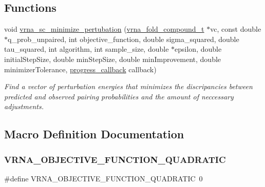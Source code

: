 \subsection*{Functions}
\begin{DoxyCompactItemize}
\item 
void \hyperlink{group__perturbation_gaa124bdc20d88001c38ade590c4bcc3c4}{vrna\+\_\+sc\+\_\+minimize\+\_\+pertubation} (\hyperlink{group__fold__compound_ga1b0cef17fd40466cef5968eaeeff6166}{vrna\+\_\+fold\+\_\+compound\+\_\+t} $\ast$vc, const double $\ast$q\+\_\+prob\+\_\+unpaired, int objective\+\_\+function, double sigma\+\_\+squared, double tau\+\_\+squared, int algorithm, int sample\+\_\+size, double $\ast$epsilon, double initial\+Step\+Size, double min\+Step\+Size, double min\+Improvement, double minimizer\+Tolerance, \hyperlink{group__perturbation_gaa715397c7afd2d2955c315512a3d571a}{progress\+\_\+callback} callback)
\begin{DoxyCompactList}\small\item\em Find a vector of perturbation energies that minimizes the discripancies between predicted and observed pairing probabilities and the amount of neccessary adjustments. \end{DoxyCompactList}\end{DoxyCompactItemize}


\subsection{Macro Definition Documentation}
\mbox{\label{group__perturbation_ga81e10993d1ae728e4e02022b33155a12}} 
\subsubsection{\texorpdfstring{V\+R\+N\+A\+\_\+\+O\+B\+J\+E\+C\+T\+I\+V\+E\+\_\+\+F\+U\+N\+C\+T\+I\+O\+N\+\_\+\+Q\+U\+A\+D\+R\+A\+T\+IC}{VRNA\_OBJECTIVE\_FUNCTION\_QUADRATIC}}
{\footnotesize\ttfamily \#define V\+R\+N\+A\+\_\+\+O\+B\+J\+E\+C\+T\+I\+V\+E\+\_\+\+F\+U\+N\+C\+T\+I\+O\+N\+\_\+\+Q\+U\+A\+D\+R\+A\+T\+IC~0}



